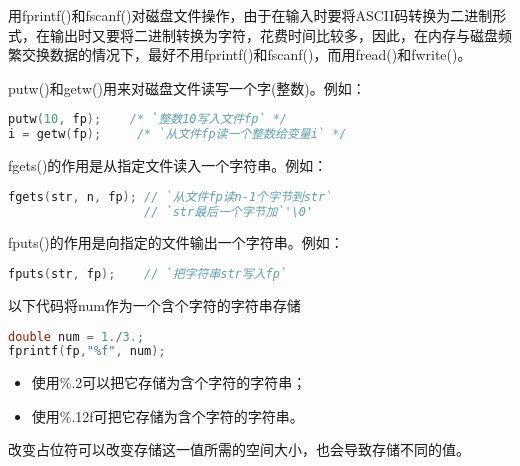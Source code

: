 \begin{frame}[fragile]
  用{\tf fprintf()}和{\tf fscanf()}对磁盘文件操作，由于在输入时要将{\tf ASCII}码转换为二进制形式，在输出时又要将二进制转换为字符，花费时间比较多，因此，在内存与磁盘频繁交换数据的情况下，最好不用{\tf fprintf()}和{\tf fscanf()}，而用{\tf fread()}和{\tf fwrite()}。
\end{frame}

\begin{frame}[fragile]
  {\tf putw()}和{\tf getw()}用来对磁盘文件读写一个字(整数)。例如：
  \begin{lstlisting}[language=c,backgroundcolor=\color{red!20}]
putw(10, fp);    /* `整数10写入文件fp` */
i = getw(fp);     /* `从文件fp读一个整数给变量i` */
  \end{lstlisting}
\end{frame}

\begin{frame}[fragile]
  {\tf fgets()}的作用是从指定文件读入一个字符串。例如：
  \begin{lstlisting}[language=c,backgroundcolor=\color{red!20}]
fgets(str, n, fp); // `从文件fp读n-1个字节到str`
                   // `str最后一个字节加`'\0'
  \end{lstlisting}
  \vspace{0.1in}

  {\tf fputs()}的作用是向指定的文件输出一个字符串。例如：
  \begin{lstlisting}[language=c,backgroundcolor=\color{red!20}]
fputs(str, fp);    // `把字符串str写入fp` 
  \end{lstlisting}

\end{frame}

\begin{frame}[fragile]
  以下代码将{\tf num}作为一个含{}个字符的字符串{}存储
  \begin{lstlisting}[language=c]
double num = 1./3.;
fprintf(fp,"%f", num);    
\end{lstlisting}
  \begin{itemize}
  \item 使用{\tf \%.2}可以把它存储为含{}个字符的字符串{}；\\
  \item 使用{\tf \%.12f}可把它存储为含{}个字符的字符串{}。
  \end{itemize}
  改变占位符可以改变存储这一值所需的空间大小，也会导致存储不同的值。
\end{frame}

